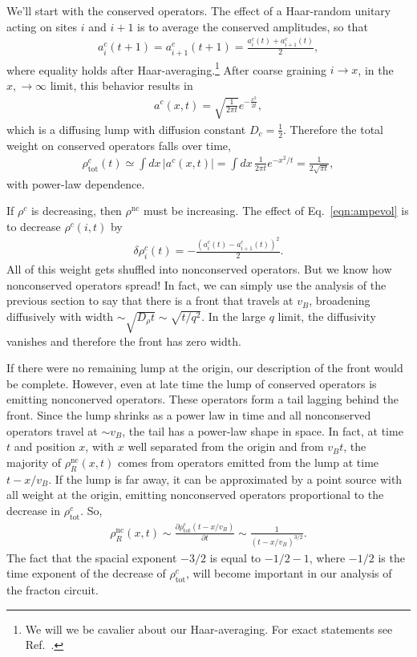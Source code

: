 \documentclass[a4paper,12pt]{article}
\newcommand{\pd}[2]{\frac{\partial #1}{\partial #2}}
\renewcommand{\th}[1]{\frac{1}{#1}}
\newcommand{\abs}[1]{\left| #1 \right|}
\newcommand{\nc}{\text{nc}}
\newcommand{\tot}{\text{tot}}
\begin{document}
We'll start with the conserved operators. The effect of a Haar-random unitary acting on sites $i$ and $i+1$ is to average the conserved amplitudes, so that
\begin{align}
a^c_i(t+1)=a^c_{i+1}(t+1) = \frac{a^c_i(t)+a^c_{i+1}(t)}{2}, \label{eqn:ampevol}
\end{align}
where equality holds after Haar-averaging.\footnote{We will we be cavalier about our Haar-averaging. For exact statements see Ref.~\cite{KhemaniOpSp}.} After coarse graining $i\to x$, in the $x, \to\infty$ limit, this behavior results in 
\begin{align}
a^c(x,t) = \sqrt{\frac{1}{2\pi t}}e^{-\frac{x^2}{2t}},
\end{align}
which is a diffusing lump with diffusion constant $D_c=\th{2}$. Therefore the total weight on conserved operators falls over time,
\begin{align}
\rho^c_\tot(t) \simeq \int dx\,\abs{a^c(x,t)} = \int dx\,\th{2\pi t}e^{-x^2/t} 
	=\th{2\sqrt{\pi t}}, \label{eqn:rhoc}
\end{align}
with power-law dependence.

If $\rho^c$ is decreasing, then $\rho^\nc$ must be increasing. The effect of Eq.~\ref{eqn:ampevol} is to decrease $\rho^c(i,t)$ by
\begin{align}
\delta \rho^c_i(t) = -\frac{(a^c_i(t)-a^c_{i+1}(t))^2}{2}.
\end{align}
All of this weight gets shuffled into nonconserved operators. But we know how nonconserved operators spread! In fact, we can simply use the analysis of the previous section to say that there is a front that travels at $v_B$, broadening diffusively with width $\sim\sqrt{D_\rho t}\sim\sqrt{t/q^2}$. In the large $q$ limit, the diffusivity vanishes and therefore the front has zero width.

If there were no remaining lump at the origin, our description of the front would be complete. However, even at late time the lump of conserved operators is emitting nonconerved operators. These operators form a tail lagging behind the front. Since the lump shrinks as a power law in time and all nonconserved operators travel at $\sim v_B$, the tail has a power-law shape in space. In fact, at time $t$ and position $x$, with $x$ well separated from the origin and from $v_Bt$, the majority of $\rho^\nc_R(x,t)$ comes from operators emitted from the lump at time $t-x/v_B$. If the lump is far away, it can be approximated by a point source with all weight at the origin, emitting nonconserved operators proportional to the decrease in $\rho^c_\tot$. So,
\begin{align}
\rho_R^\nc(x,t)\sim\pd{\rho_\tot^c(t-x/v_B)}{t} \sim\th{(t-x/v_B)^{3/2}}. 
	\label{eqn:powtail}
\end{align}
The fact that the spacial exponent $-3/2$ is equal to $-1/2-1$, where $-1/2$ is the time exponent of the decrease of $\rho_\tot^c$, will become important in our analysis of the fracton circuit.
\end{document}
